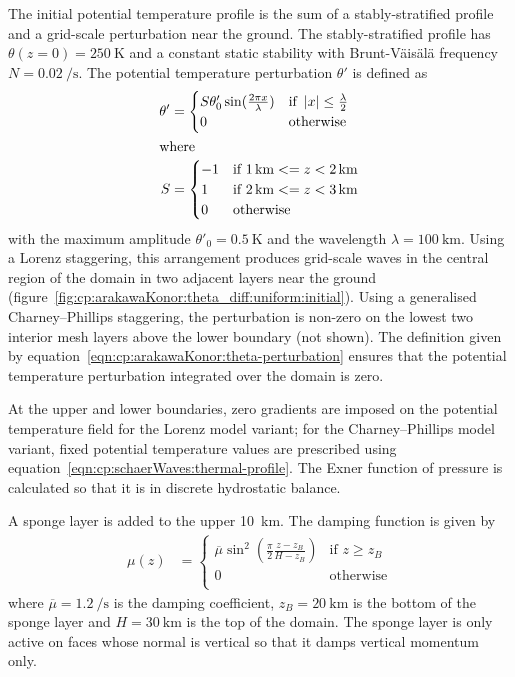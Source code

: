 The initial potential temperature profile is the sum of a stably-stratified profile and a grid-scale perturbation near the ground.
The stably-stratified profile has $\theta(z = 0) = \SI{250}{\kelvin}$ and a constant static stability with Brunt-V\"ais\"al\"a frequency $N = \SI{0.02}{\per\second}$.
The potential temperature perturbation $\theta'$ is defined as
\begin{subequations}
\label{eqn:cp:arakawaKonor:theta-perturbation}
\begin{align}
	\theta' &= \begin{cases} S \theta'_0 \sin(\frac{2 \pi x}{\lambda}) & \text{if } \left\lvert x \right\rvert \leq \frac{\lambda}{2} \\
		0 & \text{otherwise} \\
	\end{cases} \\
\shortintertext{where}
	S &= \begin{cases}
		-1 & \text{if } \SI{1}{\kilo\meter} <= z < \SI{2}{\kilo\meter} \\
		1 & \text{if } \SI{2}{\kilo\meter} <= z < \SI{3}{\kilo\meter} \\
		0 & \text{otherwise} \\
	\end{cases}
\end{align}
\end{subequations}
with the maximum amplitude $\theta'_0 = \SI{0.5}{\kelvin}$ and the wavelength $\lambda = \SI{100}{\kilo\meter}$.
Using a Lorenz staggering, this arrangement produces grid-scale waves in the central region of the domain in two adjacent layers near the ground (figure~\ref{fig:cp:arakawaKonor:theta_diff:uniform:initial}).
Using a generalised Charney--Phillips staggering, the perturbation is non-zero on the lowest two interior mesh layers above the lower boundary (not shown).
The definition given by equation~\eqref{eqn:cp:arakawaKonor:theta-perturbation} ensures that the potential temperature perturbation integrated over the domain is zero.

At the upper and lower boundaries, zero gradients are imposed on the potential temperature field for the Lorenz model variant; for the Charney--Phillips model variant, fixed potential temperature values are prescribed using equation~\ref{eqn:cp:schaerWaves:thermal-profile}.
The Exner function of pressure is calculated so that it is in discrete hydrostatic balance.

A sponge layer is added to the upper \SI{10}{\kilo\meter}.  The damping function is given by
\begin{align}
	\mu(z) &= \begin{cases}
		\overline{\mu} \sin^2 \left( \frac{\pi}{2} \frac{z - z_B}{H - z_B} \right) & \text{if } z \geq z_B \\
		0 & \text{otherwise} \\
	\end{cases}
\end{align}
where $\overline{\mu} = \SI{1.2}{\per\second}$ is the damping coefficient, $z_B = \SI{20}{\kilo\meter}$ is the bottom of the sponge layer and $H = \SI{30}{\kilo\meter}$ is the top of the domain.
The sponge layer is only active on faces whose normal is vertical so that it damps vertical momentum only.



